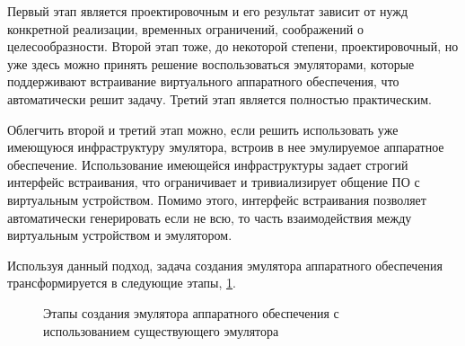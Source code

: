 
Первый этап является проектировочным и его результат зависит от нужд конкретной реализации, временных ограничений,
соображений о целесообразности.
Второй этап тоже, до некоторой степени, проектировочный, но уже здесь можно принять решение
воспользоваться эмуляторами, которые поддерживают встраивание виртуального аппаратного обеспечения,
что автоматически решит задачу.
Третий этап является полностью практическим.

Облегчить второй и третий этап можно, если решить использовать уже имеющуюся инфраструктуру эмулятора,
встроив в нее эмулируемое аппаратное обеспечение.
Использование имеющейся инфраструктуры задает строгий интерфейс встраивания, что ограничивает и тривиализирует
общение ПО с виртуальным устройством.
Помимо этого, интерфейс встраивания позволяет автоматически генерировать если не всю, то часть взаимодействия
между виртуальным устройством и эмулятором.

Используя данный подход, задача создания эмулятора аппаратного обеспечения трансформируется в следующие этапы,
\cref{fig:emu-creation-pro}.

\begin{figure}[!htbp]
    \centering
    \caption{Этапы создания эмулятора аппаратного обеспечения с использованием существующего эмулятора}\label{fig:emu-creation-pro}
\end{figure}

